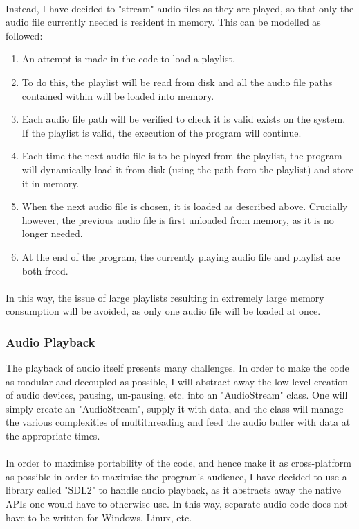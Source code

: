 \paragraph{}
Instead, I have decided to "stream" audio files as they are played, so that only the audio file currently needed is resident in memory. This can be modelled as followed:
\begin{enumerate}
	\item An attempt is made in the code to load a playlist.
	\item To do this, the playlist will be read from disk and all the audio file paths contained within will be loaded into memory.
	\item Each audio file path will be verified to check it is valid exists on the system. If the playlist is valid, the execution of the program will continue.
	\item Each time the next audio file is to be played from the playlist, the program will dynamically load it from disk (using the path from the playlist) and store it in memory.
	\item When the next audio file is chosen, it is loaded as described above. Crucially however, the previous audio file is first unloaded from memory, as it is no longer needed.
	\item At the end of the program, the currently playing audio file and playlist are both freed.
\end{enumerate}

\paragraph{}
In this way, the issue of large playlists resulting in extremely large memory consumption will be avoided, as only one audio file will be loaded at once. 

\subsubsection{Audio Playback}
The playback of audio itself presents many challenges. In order to make the code as modular and decoupled as possible, I will abstract away the low-level creation of audio devices, pausing, un-pausing, etc. into an "AudioStream" class. One will simply create an "AudioStream", supply it with data, and the class will manage the various complexities of multithreading and feed the audio buffer with data at the appropriate times.

\paragraph{}
In order to maximise portability of the code,  and hence make it as cross-platform as possible in order to maximise the program's audience, I have decided to use a library called "SDL2" to handle audio playback, as it abstracts away the native APIs one would have to otherwise use. In this way, separate audio code does not have to be written for Windows, Linux, etc.

